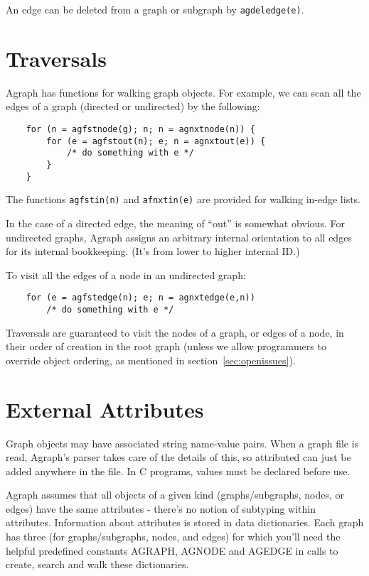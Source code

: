 \documentclass[11pt,letterpaper]{article}
\begin{document}
An edge can be deleted from a graph or subgraph by \verb"agdeledge(e)".  

\section{Traversals}
\label{sec:traversals}

Agraph has functions for walking graph objects.
For example, we can scan all the edges of a graph (directed
or undirected) by the following:

\begin{verbatim}
    for (n = agfstnode(g); n; n = agnxtnode(n)) {
        for (e = agfstout(n); e; n = agnxtout(e)) {
            /* do something with e */
        }
    }
\end{verbatim}

The functions \verb"agfstin(n)" and \verb"afnxtin(e)" are
provided for walking in-edge lists.

In the case of a directed edge, the meaning of ``out'' is somewhat
obvious.  For undirected graphs, Agraph assigns an arbitrary internal
orientation to all edges for its internal bookkeeping. (It's from
lower to higher internal ID.)

To visit all the edges of a node in an undirected graph:

\begin{verbatim}
    for (e = agfstedge(n); e; n = agnxtedge(e,n))
        /* do something with e */
\end{verbatim}

Traversals are guaranteed to visit the nodes of a graph, or edges of a node,
in their order of creation in the root graph (unless we allow programmers
to override object ordering, as mentioned in section~\ref{sec:openissues}).

\section{External Attributes}
\label{sec:externalattributes}

Graph objects may have associated string name-value pairs.  
When a graph file is read, Agraph's parser takes care of 
the details of this, so attributed can just be added
anywhere in the file.  In C programs, values must be
declared before use.

Agraph assumes that all objects of a given kind (graphs/subgraphs,
nodes, or edges) have the same attributes - there's no notion of
subtyping within attributes.   Information about attributes is 
stored in data dictionaries.  Each graph has three (for
graphs/subgraphs, nodes, and edges) for which you'll need the
helpful predefined constants AGRAPH, AGNODE and AGEDGE in
calls to create, search and walk these dictionaries.
\end{document}
